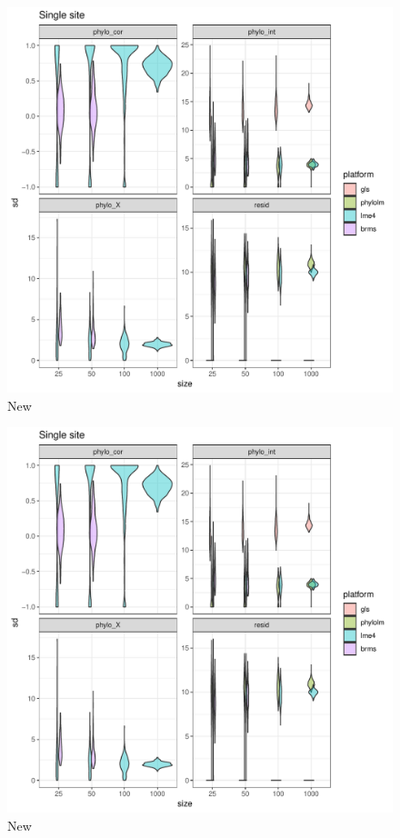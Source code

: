 \begin{center}
\begin{figure}[h]
  \includegraphics[scale=0.8,page=1]{./git_push/plot.Rout.pdf}
  \caption{New}
\label{ssplot}
\end{figure}
\end{center}


\begin{center}
\begin{figure}[h]
  \includegraphics[scale=0.8,page=2]{./git_push/plot.Rout.pdf}
  \caption{New}
\label{ssplot}
\end{figure}
\end{center}


